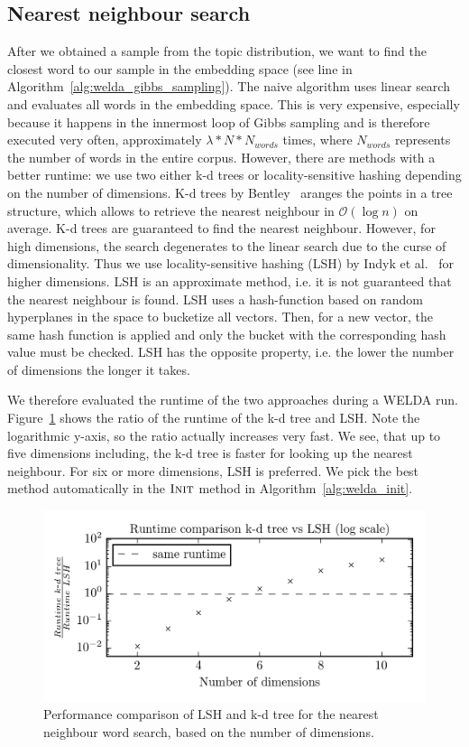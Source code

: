 \documentclass[
        a4paper,
        titlepage,
        twoside,
        parskip,
        numbers=noenddot
        ]{scrbook}
\theoremstyle{break}
\begin{document}
\subsection{Nearest neighbour search}
After we obtained a sample from the topic distribution, we want to find the closest word to our sample in the embedding space (see line in Algorithm~\ref{alg:welda_gibbs_sampling}).
The naive algorithm uses linear search and evaluates all words in the embedding space.
This is very expensive, especially because it happens in the innermost loop of Gibbs sampling and is therefore executed very often, approximately $\lambda * N * N_{words}$ times, where $N_{words}$ represents the number of words in the entire corpus.
However, there are methods with a better runtime: we use two either k-d trees or locality-sensitive hashing depending on the number of dimensions.
K-d trees by Bentley~\cite{Bentley1975} aranges the points in a tree structure, which allows to retrieve the nearest neighbour in $\mathcal{O}(\log n)$ on average.
K-d trees are guaranteed to find the nearest neighbour.
However, for high dimensions, the search degenerates to the linear search due to the curse of dimensionality.
Thus we use locality-sensitive hashing (LSH) by Indyk et al.~\cite{Indyk1998} for higher dimensions.
LSH is an approximate method, i.e. it is not guaranteed that the nearest neighbour is found.
LSH uses a hash-function based on random hyperplanes in the space to bucketize all vectors.
Then, for a new vector, the same hash function is applied and only the bucket with the corresponding hash value must be checked.
LSH has the opposite property, i.e. the lower the number of dimensions the longer it takes.

We therefore evaluated the runtime of the two approaches during a WELDA run.
Figure~\ref{fig:lsh_vs_kdtree} shows the ratio of the runtime of the k-d tree and LSH.
Note the logarithmic y-axis, so the ratio actually increases very fast.
We see, that up to five dimensions including, the k-d tree is faster for looking up the nearest neighbour.
For six or more dimensions, LSH is preferred.
We pick the best method automatically in the $\textsc{Init}$ method in Algorithm~\ref{alg:welda_init}.
\begin{figure}
       \centering
       \includegraphics[width=12cm]{figures/lsh_vs_kdtree.png}
       \caption{Performance comparison of LSH and k-d tree for the nearest neighbour word search, based on the number of dimensions.}
       \label{fig:lsh_vs_kdtree}
\end{figure}
\end{document}
